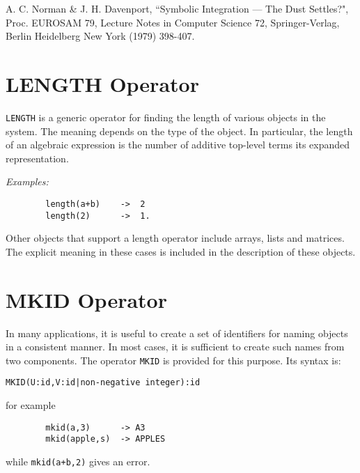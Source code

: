         A. C. Norman \& J. H. Davenport, ``Symbolic Integration --- The Dust
                Settles?", Proc. EUROSAM 79, Lecture Notes in Computer
                Science 72, Springer-Verlag, Berlin Heidelberg New York
                (1979) 398-407.

%
%
%

\section{LENGTH Operator}
{\tt LENGTH}  is a generic operator for finding the
length of various objects in the system.  The meaning depends on the type
of the object.  In particular, the length of an algebraic expression is
the number of additive top-level terms its expanded representation.

{\it Examples:}
\begin{verbatim}
        length(a+b)    ->  2
        length(2)      ->  1.
\end{verbatim}
Other objects that support a length operator include arrays, lists and
matrices. The explicit meaning in these cases is included in the description
of these objects.

\section{MKID Operator}
In many applications, it is useful to create a set of identifiers for
naming objects in a consistent manner. In most cases, it is sufficient to
create such names from two components. The operator {\tt MKID} is provided
for this purpose. Its syntax is:
\begin{verbatim}
MKID(U:id,V:id|non-negative integer):id
\end{verbatim}
for example
\begin{verbatim}
        mkid(a,3)      -> A3
        mkid(apple,s)  -> APPLES
\end{verbatim}
while {\tt mkid(a+b,2)} gives an error.

